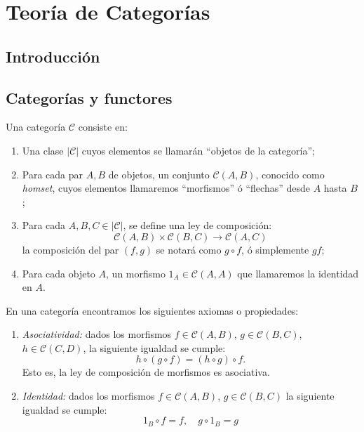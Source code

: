 
\chapter{Teoría de Categorías}\label{ch:categorias}

\section{Introducción}

\section{Categorías y functores}

\begin{definicion}\label{def_categoria}
    Una categoría $\mathscr{C}$ consiste en:
    \begin{enumerate}
        \item Una clase $|\mathscr{C}|$ cuyos elementos se llamarán ``objetos de la categoría'';
        \item Para cada par $A,B$ de objetos, un conjunto $\mathscr{C}(A,B)$, conocido como \textit{homset}, cuyos elementos llamaremos ``morfismos'' ó ``flechas'' desde $A$ hasta $B$;
        \item Para cada $A,B,C \in |\mathscr{C}|$, se define una ley de composición:
            \begin{equation}
                \mathscr{C}(A,B) \times \mathscr{C}(B,C) \longrightarrow \mathscr{C}(A,C)
            \end{equation}
        la composición del par $(f,g)$ se notará como $g\circ f$, ó simplemente $gf$;
        \item Para cada objeto $A$, un morfismo $1_{A} \in \mathscr{C}(A,A)$ que llamaremos la identidad en $A$.
    \end{enumerate}
\end{definicion}

En una categoría encontramos los siguientes axiomas o propiedades:

\begin{enumerate}
    \item \textit{Asociatividad: } dados los morfismos $f \in \mathscr{C}(A,B)$, $g \in \mathscr{C}(B,C)$, $h \in \mathscr{C}(C,D)$, la siguiente igualdad se cumple:
        \begin{equation}
            h \circ (g \circ f) = (h \circ g) \circ f.
        \end{equation}
    Esto es, la ley de composición de morfismos es asociativa.    
    \item \textit{Identidad: } dados los morfismos $f \in \mathscr{C}(A,B)$, $g \in \mathscr{C}(B,C)$ la siguiente igualdad se cumple: 
        \begin{equation}
            1_{B} \circ f = f, \quad g \circ 1_{B} = g 
        \end{equation}
\end{enumerate}


